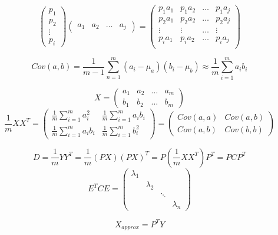 \documentclass{article}
\begin{document}
\title{}
\author{}
\date{}
\maketitle

$$\begin{pmatrix}
    p_1\\
    p_2\\
    \vdots\\
    p_i
\end{pmatrix}
\begin{pmatrix}
    a_1&a_2&\dots &a_j
\end{pmatrix}=
\begin{pmatrix}
    p_1a_1&p_1a_2&\dots & p_1a_j\\
    p_2a_1&p_2a_2&\dots & p_2a_j\\
    \vdots&\vdots&\dots & \vdots\\
    p_ia_1&p_ia_2&\dots & p_ia_j\\

\end{pmatrix}$$

$$Cov(a,b)=\frac{1}{m-1}\sum_{n=1}^{m}(a_i-\mu_a)(b_i-\mu_b)\approx \frac{1}{m}\sum_{i=1}^{m}a_ib_i$$

$$X=\begin{pmatrix}
    a_1&a_2&\dots &a_m\\
    b_1&b_2&\dots &b_m
\end{pmatrix}$$
$$\frac{1}{m}XX^T=\begin{pmatrix}
    \frac{1}{m}\sum_{i=1}^{m}a_i^2 & \frac{1}{m}\sum_{i=1}^{m}a_ib_i\\
    \frac{1}{m}\sum_{i=1}^{m}a_ib_i & \frac{1}{m}\sum_{i=1}^{m}b_i^2
\end{pmatrix}=\begin{pmatrix}
    Cov(a,a) & Cov(a,b)\\
    Cov(a,b) & Cov(b,b)
\end{pmatrix}$$

$$D=\frac{1}{m}YY^T=\frac{1}{m}(PX)(PX)^T=P(\frac{1}{m}XX^T)P^T=PCP^T$$
$$E^TCE=\begin{pmatrix}
    \lambda_1& & \\
     &\lambda_2&  \\
      & & \ddots & \\
       & & &\lambda_n
\end{pmatrix}$$

$$X_{approx} = P^TY$$
\end{document}
